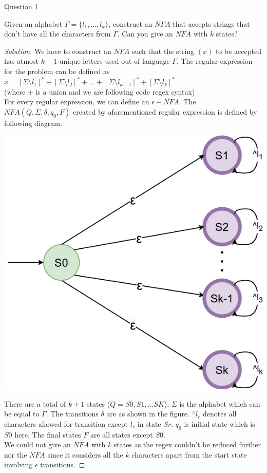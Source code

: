 \begin{solution}{Question 1}\label{ques:1}
    \begin{question}
    Given an alphabet $\Gamma = \{l_1,...,l_k\} $, construct an $NFA$ that accepts strings that don’t have all the characters from $\Gamma$. Can you give an $NFA$ with $k$ states?
    \end{question}
    \tcblower{}
    \begin{proof}[Solution]
    We have to construct an $NFA$ such that the string $(x)$ to be accepted has atmost $k-1$ unique letters used out of language $\Gamma$. The regular expression for the problem can be defined as $x = [\Sigma\setminus l_1]^* + [\Sigma\setminus l_2]^*+ \dots + [\Sigma\setminus l_{k-1}]^*+[\Sigma\setminus l_k]^*$\\
    (where + is a union and we are following code regex syntax)\\
    For every regular expression, we can define an $\epsilon-NFA$. The $NFA (Q, \Sigma, \delta, q_0, F)$ created by aforementioned regular expression is defined by following diagram:
    \begin{center}
        \includegraphics[scale=0.6]{NFA_bigalphabet.png}
    \end{center}
    There are a total of $k+1$ states ($Q = {S0,S1,...SK}$), $\Sigma$ is the alphabet which can be equal to $\Gamma$. The transitions $\delta$ are as shown in the figure. $^\wedge l_r$ denotes all characters allowed for transition except $l_r$ in state $Sr$. $q_0$ is initial state which is $S0$ here. The final states $F$ are all states except $S0$.\\
    We could not give an $NFA$ with $k$ states as the regex couldn't be reduced further nor the $NFA$ since it considers all the $k$ characters apart from the start state involving $\epsilon$ transitions.
    
    \end{proof}
\end{solution}
